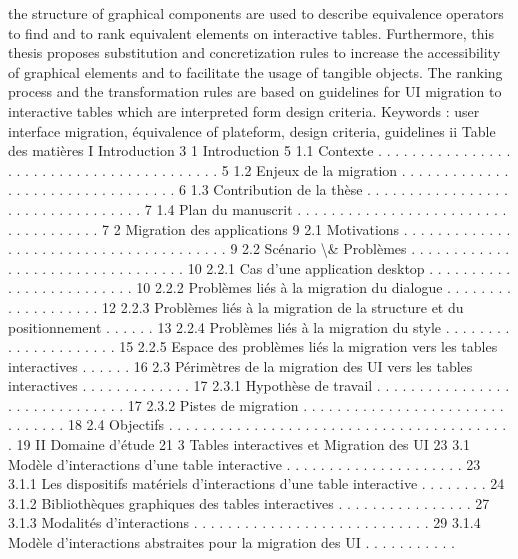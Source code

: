 \documentclass{article}
\begin{document}
the structure of graphical components are used to describe equivalence operators to ﬁnd and to rank equivalent
elements on interactive tables. Furthermore, this thesis proposes substitution and concretization rules to increase
the accessibility of graphical elements and to facilitate the usage of tangible objects. The ranking process and
the transformation rules are based on guidelines for UI migration to interactive tables which are interpreted
form design criteria.
Keywords :
user interface migration, \'{e}quivalence of plateform, design criteria, guidelines
ii
Table des mati\`{e}res
I
Introduction
3
1
Introduction
5
1.1
Contexte . . . . . . . . . . . . . . . . . . . . . . . . . . . . . . . . . . . . . . . . .
5
1.2
Enjeux de la migration
. . . . . . . . . . . . . . . . . . . . . . . . . . . . . . . . .
6
1.3
Contribution de la th\`{e}se . . . . . . . . . . . . . . . . . . . . . . . . . . . . . . . . .
7
1.4
Plan du manuscrit . . . . . . . . . . . . . . . . . . . . . . . . . . . . . . . . . . . .
7
2
Migration des applications
9
2.1
Motivations . . . . . . . . . . . . . . . . . . . . . . . . . . . . . . . . . . . . . . .
9
2.2
Sc\'{e}nario \textbackslash{}& Probl\`{e}mes
. . . . . . . . . . . . . . . . . . . . . . . . . . . . . . . . .
10
2.2.1
Cas d’une application desktop . . . . . . . . . . . . . . . . . . . . . . . . .
10
2.2.2
Probl\`{e}mes li\'{e}s \`{a} la migration du dialogue . . . . . . . . . . . . . . . . . . .
12
2.2.3
Probl\`{e}mes li\'{e}s \`{a} la migration de la structure et du positionnement
. . . . . .
13
2.2.4
Probl\`{e}mes li\'{e}s \`{a} la migration du style . . . . . . . . . . . . . . . . . . . . .
15
2.2.5
Espace des probl\`{e}mes li\'{e}s la migration vers les tables interactives . . . . . .
16
2.3
P\'{e}rim\`{e}tres de la migration des UI vers les tables interactives
. . . . . . . . . . . . .
17
2.3.1
Hypoth\`{e}se de travail . . . . . . . . . . . . . . . . . . . . . . . . . . . . . .
17
2.3.2
Pistes de migration . . . . . . . . . . . . . . . . . . . . . . . . . . . . . . .
18
2.4
Objectifs . . . . . . . . . . . . . . . . . . . . . . . . . . . . . . . . . . . . . . . . .
19
II
Domaine d’\'{e}tude
21
3
Tables interactives et Migration des UI
23
3.1
Mod\`{e}le d’interactions d’une table interactive
. . . . . . . . . . . . . . . . . . . . .
23
3.1.1
Les dispositifs mat\'{e}riels d’interactions d’une table interactive
. . . . . . . .
24
3.1.2
Biblioth\`{e}ques graphiques des tables interactives . . . . . . . . . . . . . . . .
27
3.1.3
Modalit\'{e}s d’interactions . . . . . . . . . . . . . . . . . . . . . . . . . . . .
29
3.1.4
Mod\`{e}le d’interactions abstraites pour la migration des UI . . . . . . . . . . .
\end{document}
